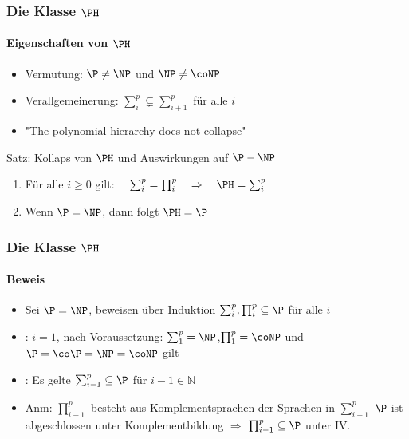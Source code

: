 \begin{frame} 
	\frametitle{Die Klasse $\PH$}
	\framesubtitle{Eigenschaften von $\PH$}
	
	\begin{itemize}[<+->]
		\item Vermutung: $\P \neq \NP$ und $\NP \neq \coNP$	
		\item Verallgemeinerung:    $\sum_{i}^{p}  \subsetneq \sum_{i+1}^{p}$ für alle $i$
		\item "The polynomial hierarchy does not collapse"
	\end{itemize}
	\bigskip
	\pause
	\begin{KITinfoblock}{Satz: Kollaps von $\PH$ und Auswirkungen auf $\P-\NP$}
		\begin{enumerate}[<+->]
			\item Für alle $ i \geq 0$ gilt: $ \quad \sum_{i}^{p} = \prod_{i}^{p} \quad \Rightarrow \quad \PH = \sum_{i}^{p}$
			\item Wenn $\P = \NP$, dann folgt $\PH = \P$
		\end{enumerate}
	\end{KITinfoblock}
\end{frame}
\begin{frame} 
	\frametitle{Die Klasse $\PH$}
	\framesubtitle{Beweis}
	\begin{itemize}[<+->]
		\item Sei $\P = \NP$, beweisen über Induktion $\sum_{i}^{p},\prod_{i}^{p} \subseteq \P$ für alle $i$
		\bigskip
		\item {}: $i=1$, nach Voraussetzung: $\sum_{1}^{p} = \NP$,\quad$\prod_{1}^{p} = \coNP$ \newline
				und $\P = \co\P = \NP = \coNP$ gilt
		\bigskip
		\item {}: Es gelte  $\sum_{i-1}^{p} \subseteq \P$ für $i-1 \in \mathbb{N}$  
		\item Anm: $\prod_{i-1}^{p}$ besteht aus Komplementsprachen der Sprachen in $\sum_{i-1}^{p}$ \newline $\P$ ist abgeschlossen unter Komplementbildung $\Rightarrow$  $\prod_{i-1}^{p} \subseteq \P$ unter IV.
		
	 
		
	\end{itemize}
\end{frame} 

